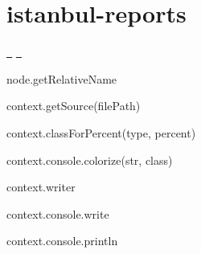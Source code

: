 \chapter{istanbul-\/reports}
\hypertarget{md_node__modules_2istanbul-reports_2README}{}\label{md_node__modules_2istanbul-reports_2README}
\label{md_node__modules_2istanbul-reports_2README_autotoc_md16569}%
%
 \href{https://greenkeeper.io/}{\texttt{ }} \href{https://travis-ci.org/istanbuljs/istanbul-reports}{\texttt{ }}


\begin{DoxyItemize}
\item node.\+get\+Relative\+Name
\item context.\+get\+Source(file\+Path)
\item context.\+class\+For\+Percent(type, percent)
\item context.\+console.\+colorize(str, class)
\item context.\+writer
\item context.\+console.\+write
\item context.\+console.\+println 
\end{DoxyItemize}